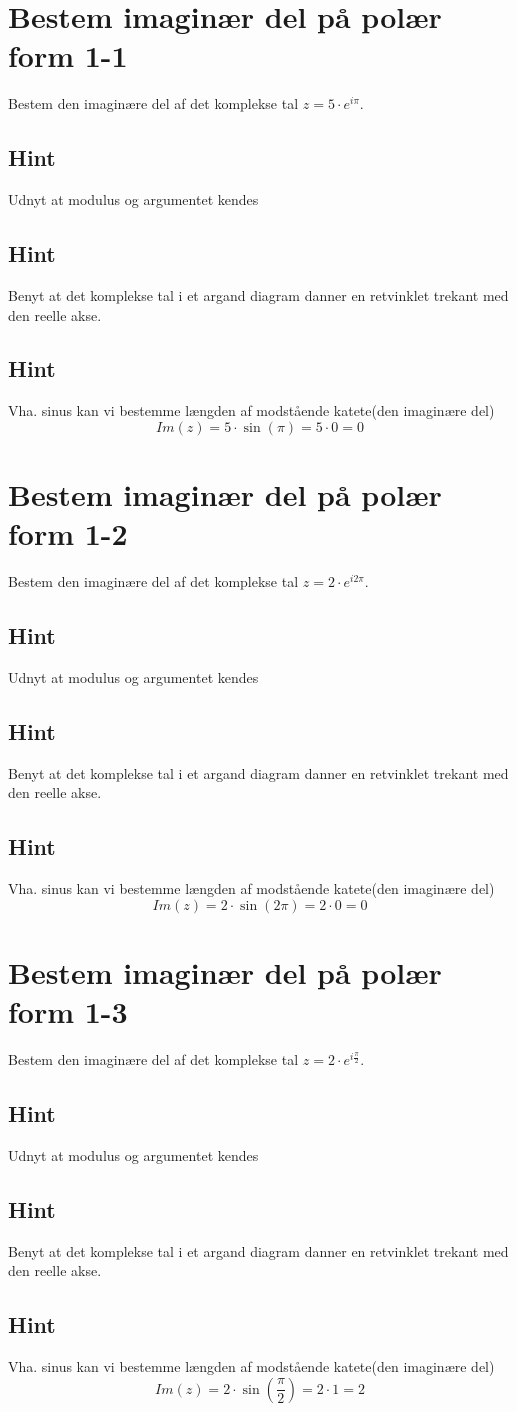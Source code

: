 \documentclass{article}
\newenvironment{exercise}[1]{\newpage\section{#1}}{}
\newcommand{\answerbox}[1]{\fbox{$#1$}}
\newcommand{\hint}{\subsection*{Hint}}
\begin{document}
\tableofcontents
\newpage

\begin{exercise}{Bestem imaginær del på polær form 1-1}

Bestem den imaginære del af det komplekse tal $z=5 \cdot e^{i \pi}$.

\answerbox{0}


\hint 

Udnyt at modulus og argumentet kendes


\hint

Benyt at det komplekse tal i et argand diagram danner en retvinklet trekant med den reelle akse. 

\hint 

Vha. sinus kan vi bestemme længden af modstående katete(den imaginære del)
\[
Im(z) =  5 \cdot \sin(\pi) = 5 \cdot 0 = 0
\]

\end{exercise}

\newpage

\begin{exercise}{Bestem imaginær del på polær form 1-2}
	
	Bestem den imaginære del af det komplekse tal $z=2 \cdot e^{i 2\pi}$.
	
	\answerbox{0}
	
	
	\hint 
	
	Udnyt at modulus og argumentet kendes
	
	
	\hint
	
	Benyt at det komplekse tal i et argand diagram danner en retvinklet trekant med den reelle akse. 
	
	\hint 
	
	Vha. sinus kan vi bestemme længden af modstående katete(den imaginære del)
	\[
	Im(z) =  2 \cdot \sin(2\pi) = 2 \cdot 0 = 0
	\]
	
\end{exercise}

\newpage

\begin{exercise}{Bestem imaginær del på polær form 1-3}
	
	Bestem den imaginære del af det komplekse tal $z=2 \cdot e^{i \frac{\pi}{2}}$.
	
	\answerbox{2}
	
	
	\hint 
	
	Udnyt at modulus og argumentet kendes
	
	
	\hint
	
	Benyt at det komplekse tal i et argand diagram danner en retvinklet trekant med den reelle akse. 
	
	\hint 
	
	Vha. sinus kan vi bestemme længden af modstående katete(den imaginære del)
	\[
	Im(z) =  2 \cdot \sin\left(\frac{\pi}{2}\right) = 2 \cdot 1 = 2
	\]
	
\end{exercise}
\end{document}
